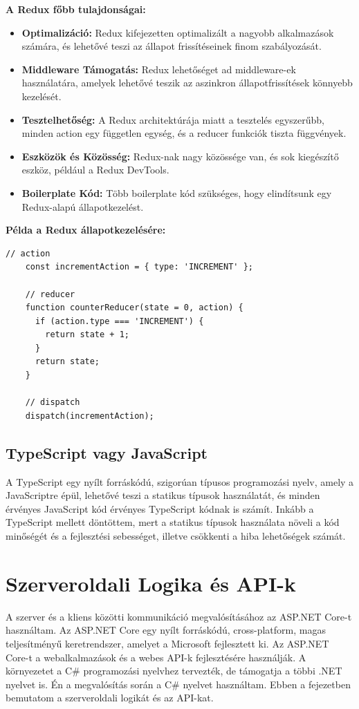 \textbf{A Redux főbb tulajdonságai:}
\begin{itemize}
    \item \textbf{Optimalizáció:} Redux kifejezetten optimalizált a nagyobb alkalmazások számára, és lehetővé teszi az állapot frissítéseinek finom szabályozását.
    \item \textbf{Middleware Támogatás:} Redux lehetőséget ad middleware-ek használatára, amelyek lehetővé teszik az aszinkron állapotfrissítések könnyebb kezelését.
    \item \textbf{Tesztelhetőség:} A Redux architektúrája miatt a tesztelés egyszerűbb, minden action egy független egység, és a reducer funkciók tiszta függvények.
    \item \textbf{Eszközök és Közösség:} Redux-nak nagy közössége van, és sok kiegészítő eszköz, például a Redux DevTools.
    \item \textbf{Boilerplate Kód:} Több boilerplate kód szükséges, hogy elindítsunk egy Redux-alapú állapotkezelést.
\end{itemize}
\textbf{Példa a Redux állapotkezelésére:}
\begin{lstlisting}[style=es6, morekeywords={document, P5, katex},caption={Redux állapotkezelése}]
    // action
    const incrementAction = { type: 'INCREMENT' };
    
    // reducer
    function counterReducer(state = 0, action) {
      if (action.type === 'INCREMENT') {
        return state + 1;
      }
      return state;
    }
    
    // dispatch
    dispatch(incrementAction);
\end{lstlisting}
\vspace{1em}
\subsection*{TypeScript vagy JavaScript}
A TypeScript egy nyílt forráskódú, szigorúan típusos programozási nyelv,
amely a JavaScriptre épül, lehetővé teszi a statikus típusok használatát,
és minden érvényes JavaScript kód érvényes TypeScript kódnak is számít.
Inkább a TypeScript mellett döntöttem, mert a statikus típusok használata
növeli a kód minőségét és a fejlesztési sebességet, illetve csökkenti a hiba lehetőségek számát.

\section{Szerveroldali Logika és API-k}
A szerver és a kliens közötti kommunikáció megvalósításához az ASP.NET Core-t használtam.
Az ASP.NET Core egy nyílt forráskódú, cross-platform, magas teljesítményű keretrendszer,
amelyet a Microsoft fejlesztett ki.
Az ASP.NET Core-t a webalkalmazások és a webes API-k fejlesztésére használják.
A környezetet a C\# programozási nyelvhez tervezték, de támogatja a többi .NET nyelvet is.
Én a megvalósítás során a C\# nyelvet használtam.
Ebben a fejezetben bemutatom a szerveroldali logikát és az API-kat.

